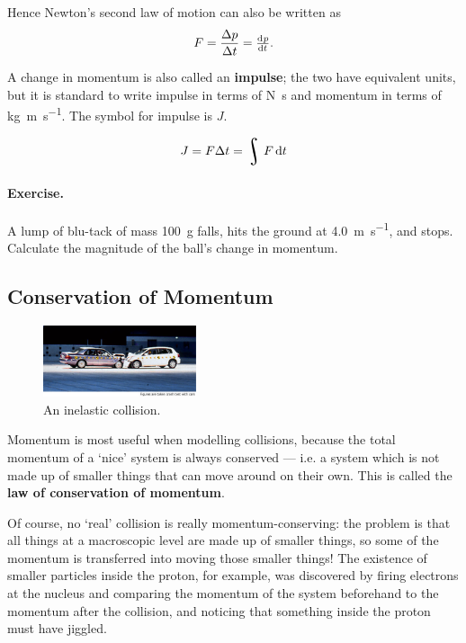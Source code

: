 \documentclass[a4paper]{amsbook}
\DeclareMathOperator*{\rint}{\scalerel*{\rotatebox{17}{$\!\int\!$}}{\int}}
\newcommand\capcite[1]{}
\begin{document}
Hence Newton's second law of motion can also be written as
\begin{equation}
  F = \frac{\Delta p}{\Delta t} = \od{p}{t}.
\end{equation}

A change in momentum is also called an \textbf{impulse}; the two have equivalent units, but it is standard to write impulse in
terms of \si{\newton\second} and momentum in terms of \si{\kilo\gram\meter\per\second}. The symbol for impulse is $ J $.

\begin{equation}
  J = F \Delta t = \rint F \dif{t}
\end{equation}

\paragraph{Exercise.} A lump of blu-tack of mass \SI{100}{\gram} falls, hits the ground at \SI{4.0}{\metre\per\second}, and stops. Calculate
the magnitude of the ball's change in momentum.

\subsection{Conservation of Momentum}
\begin{figure}
  \centering
  \includegraphics[width=0.4\textwidth]{carcrash}
  \caption{An inelastic collision. \capcite{http://world.honda.com/factbook/auto/motorshow/200110/img/12_p02.jpg}\label{fig:baddriver}}
\end{figure}
Momentum is most useful when modelling collisions, because the total momentum of a `nice' system is always conserved --- i.e. a system which is
not made up of smaller things that can move around on their own. This is called the \textbf{law of conservation of momentum}.

Of course, no `real' collision is really momentum-conserving: the problem is that all things at a macroscopic level are made up of smaller things,
so some of the momentum is transferred into moving those smaller things! The existence of smaller particles inside the proton, for example, was
discovered by firing electrons at the nucleus and comparing the momentum of the system beforehand to the momentum after the collision, and noticing
that something inside the proton must have jiggled.
\end{document}
